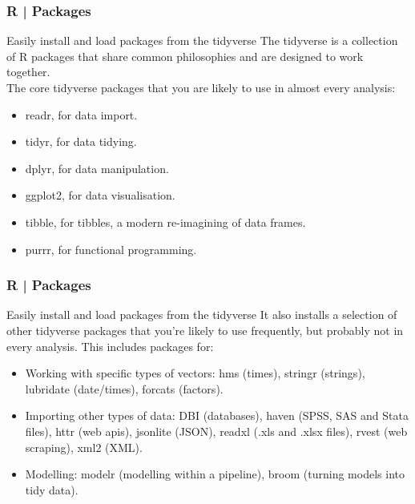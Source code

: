 \begin{frame}
  \frametitle{R | Packages}
  \begin{block}{Easily install and load packages from the tidyverse}
    The \alert{tidyverse} is a collection of R packages that share common philosophies and are designed to work together.\\
    \vspace{0.3em}
    The \alert{core tidyverse packages} that you are likely to use in almost every analysis:
    \begin{itemize}
      \item readr, for data import.
      \item tidyr, for data tidying.
      \item dplyr, for data manipulation.
      \item ggplot2, for data visualisation.
      \item tibble, for tibbles, a modern re-imagining of data frames.
      \item purrr, for functional programming.
    \end{itemize}
  \end{block}
\end{frame}

\begin{frame}
  \frametitle{R | Packages}
  \begin{block}{Easily install and load packages from the tidyverse}
    It also installs a selection of other tidyverse packages that you're likely to use frequently, but probably not in every analysis. This includes packages for:
    \begin{itemize}
      \item Working with specific types of vectors: hms (times), stringr (strings), lubridate (date/times), forcats (factors).
      \item Importing other types of data: DBI (databases), haven (SPSS, SAS and Stata files), httr (web apis), jsonlite (JSON), readxl (.xls and .xlsx files), rvest (web scraping), xml2 (XML).
      \item Modelling: modelr (modelling within a pipeline), broom (turning models into tidy data).
    \end{itemize}
  \end{block}
\end{frame}

